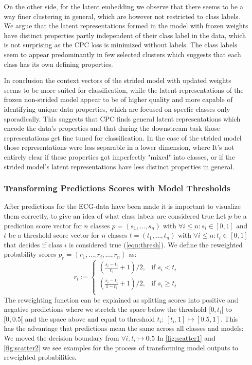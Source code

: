 On the other side, for the latent embedding we observe that there seems to be a way finer clustering in general, which are however not restricted to class labels. We argue that the latent representations formed in the model with frozen weights have distinct properties partly independent of their class label in the data, which is not surprising as the CPC loss is minimized without labels. The class labels seem to appear predominantly in few selected clusters which suggests that each class has its own defining properties.

In conclusion the context vectors of the strided model with updated weights seems to be more suited for classification, while the latent representations of the frozen non-strided model appear to be of higher quality and more capable of identifying unique data properties, which are focused on specfic classes only sporadically.
This suggests that CPC finds general latent representations which encode the data's properties and that during the downstream task those representations get fine tuned for classification. In the case of the strided model those representations were less separable in a lower dimension, where It's not entirely clear if these properties got imperfectly "mixed" into classes, or if the strided model's latent representations have less distinct properties in general.

\subsubsection{Transforming Predictions Scores with Model Thresholds}
After predictions for the ECG-data have been made it is important to visualize them correctly, to give an idea of what class labels are considered true
Let $p$ be a prediction score vector for $n$ classes $p=(s_1,\ldots,s_n)$ with $\forall i\leq n: s_i\in[0, 1]$ and $t$ be a threshold score vector for $n$ classes $t=(t_1,\ldots,t_n)$ with $\forall i\leq n: t_i\in[0, 1]$ that decides if class $i$ is considered true (\autoref{eqn:thresh}). We define the reweighted probability scores $p_r=(r_1, \ldots, r_i, \ldots, r_n)$ as:
\begin{equation}
	r_i:=
	\begin{cases}
		(\frac{s_i-t_i}{t_i}+1)/2,& \text{if } s_i < t_i\\
		(\frac{s_i-t_i}{1-t_i}+1)/2,& \text{if } s_i \geq t_i\\
	\end{cases}
	\label{eqn:rew-probs}
\end{equation}
The reweighting function can be explained as splitting scores into positive and negative predictions where we stretch the space below the threshold $[0, t_i[$ to $[0, 0.5[$ and the space above and equal to threshold $t_i$: $[t_i, 1] \mapsto [0.5, 1]$. This has the advantage that predictions mean the same across all classes and models: We moved the decision boundary from $\forall{i}, t_i\mapsto0.5$ In \autoref{fig:scatter1} and \autoref{fig:scatter2} we see examples for the process of transforming  model outputs to reweighted probabilities.


